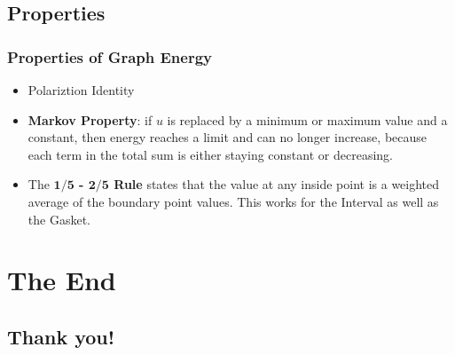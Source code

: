 \documentclass{beamer}
\begin{document}
\subsection{Properties}
\begin{frame}
	\frametitle{Properties of Graph Energy}
	\begin{itemize}
		\item Polariztion Identity
		\item \textbf{Markov Property}: if $u$ is replaced by a minimum or maximum value and a constant, then energy reaches a limit and can no longer increase, because each term in the total sum is either staying constant or decreasing.
		\item The \textbf{$\mathbf{1/5}$ - $\mathbf{2/5}$ Rule} states that the value at any inside point is a weighted average of the boundary point values. This works for the Interval as well as the Gasket.
	\end{itemize}
\end{frame}

\section*{The End}
\subsection*{Thank you!}
\begin{frame}
	\begin{center}
	\end{center}
\end{frame}
\end{document}
